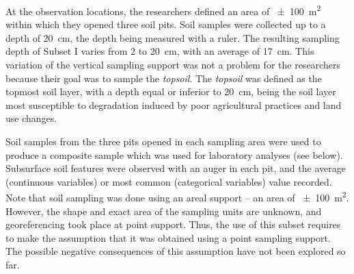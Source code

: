 At the observation locations, the researchers defined an area of \SI{\pm100}{\metre\squared} within which
they opened three soil pits. Soil samples were collected up to a depth of \SI{20}{\centi\metre}, the depth 
being measured with a ruler. The resulting sampling depth of Subset I varies from \num{2} to 
\SI{20}{\centi\metre}, with an average of \SI{17}{\centi\metre}. This variation of the vertical sampling 
support was not a problem for the researchers because their goal was to sample the \emph{topsoil}. The
\emph{topsoil} was defined as the topmost soil layer, with a depth equal or inferior to 
\SI{20}{\centi\metre}, being the soil layer most susceptible to degradation induced by poor agricultural 
practices and land use changes.

Soil samples from the three pits opened in each sampling area were used to produce a composite sample
which was used for laboratory analyses (see below). Subsurface soil features were observed with an auger 
in each pit, and the average (continuous variables) or most common (categorical variables) value recorded.
Note that soil sampling was done using an areal support -- an area of \SI{\pm100}{\metre\squared}. However, 
the shape and exact area of the sampling units are unknown, and georeferencing took place at point 
support. Thus, the use of this subset requires to make the assumption that it was obtained using a point
sampling support. The possible negative consequences of this assumption have not been explored so far.

